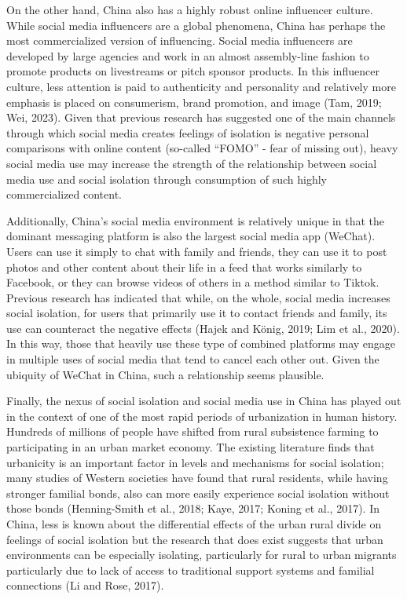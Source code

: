 \documentclass[
  letterpaper,
  DIV=11,
  numbers=noendperiod]{scrartcl}
\begin{document}
On the other hand, China also has a highly robust online influencer
culture. While social media influencers are a global phenomena, China
has perhaps the most commercialized version of influencing. Social media
influencers are developed by large agencies and work in an almost
assembly-line fashion to promote products on livestreams or pitch
sponsor products. In this influencer culture, less attention is paid to
authenticity and personality and relatively more emphasis is placed on
consumerism, brand promotion, and image (Tam, 2019; Wei, 2023). Given
that previous research has suggested one of the main channels through
which social media creates feelings of isolation is negative personal
comparisons with online content (so-called ``FOMO'' - fear of missing
out), heavy social media use may increase the strength of the
relationship between social media use and social isolation through
consumption of such highly commercialized content.

Additionally, China's social media environment is relatively unique in
that the dominant messaging platform is also the largest social media
app (WeChat). Users can use it simply to chat with family and friends,
they can use it to post photos and other content about their life in a
feed that works similarly to Facebook, or they can browse videos of
others in a method similar to Tiktok. Previous research has indicated
that while, on the whole, social media increases social isolation, for
users that primarily use it to contact friends and family, its use can
counteract the negative effects (Hajek and König, 2019; Lim et al.,
2020). In this way, those that heavily use these type of combined
platforms may engage in multiple uses of social media that tend to
cancel each other out. Given the ubiquity of WeChat in China, such a
relationship seems plausible.

Finally, the nexus of social isolation and social media use in China has
played out in the context of one of the most rapid periods of
urbanization in human history. Hundreds of millions of people have
shifted from rural subsistence farming to participating in an urban
market economy. The existing literature finds that urbanicity is an
important factor in levels and mechanisms for social isolation; many
studies of Western societies have found that rural residents, while
having stronger familial bonds, also can more easily experience social
isolation without those bonds (Henning-Smith et al., 2018; Kaye, 2017;
Koning et al., 2017). In China, less is known about the differential
effects of the urban rural divide on feelings of social isolation but
the research that does exist suggests that urban environments can be
especially isolating, particularly for rural to urban migrants
particularly due to lack of access to traditional support systems and
familial connections (Li and Rose, 2017).
\end{document}
